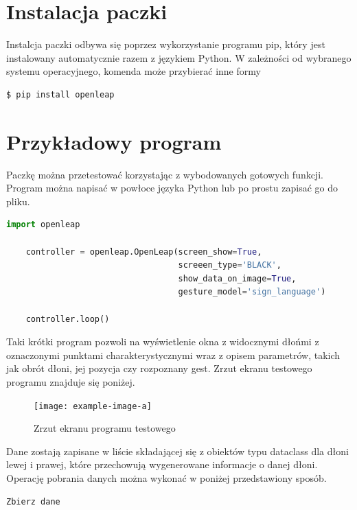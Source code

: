 \section{Instalacja paczki}
\quad Instalcja paczki odbywa się poprzez wykorzystanie programu pip, który jest instalowany automatycznie razem z językiem Python. W zależności od wybranego systemu operacyjnego, komenda może przybierać inne formy 

\begin{lstlisting}[language=bash]
    $ pip install openleap
\end{lstlisting}

\section{Przykładowy program}

\quad Paczkę można przetestować korzystając z wybodowanych gotowych funkcji. Program można napisać w powłoce języka Python lub po prostu zapisać go do pliku. 

\begin{lstlisting}[language=python]
    import openleap

    controller = openleap.OpenLeap(screen_show=True, 
                                   screeen_type='BLACK', 
                                   show_data_on_image=True, 
                                   gesture_model='sign_language')
    
    controller.loop()
\end{lstlisting}

\quad Taki krótki program pozwoli na wyświetlenie okna z widocznymi dłońmi z oznaczonymi punktami charakterystycznymi wraz z opisem parametrów, takich jak obrót dłoni, jej pozycja czy rozpoznany gest. Zrzut ekranu testowego programu znajduje się poniżej. 

\begin{figure}[H]
    \begin{center}
        \texttt{[image: example-image-a]}
        \caption{Zrzut ekranu programu testowego}
    \end{center}
\end{figure}

\quad Dane zostają zapisane w liście składającej się z obiektów typu dataclass dla dłoni lewej i prawej, które przechowują wygenerowane informacje o danej dłoni. Operację pobrania danych można wykonać w poniżej przedstawiony sposób. 

\begin{lstlisting}[language=python]
    Zbierz dane
\end{lstlisting}

